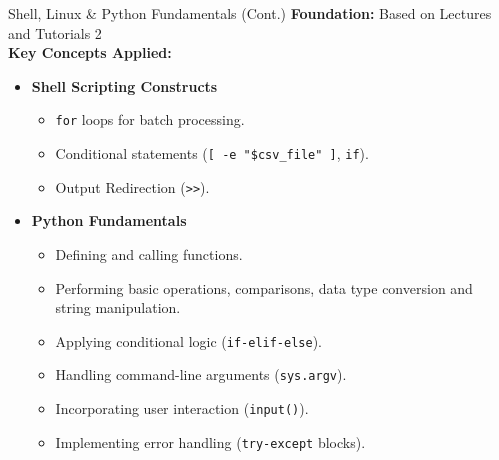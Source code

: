 \documentclass[12pt, aspectratio=169]{beamer}
\renewcommand{\small}{\fontsize{11}{13}\selectfont}
\newcommand{\rcode}[1]{{\small\texttt{#1}}}
\begin{document}
  \begin{frame}[t]{Shell, Linux \& Python Fundamentals (Cont.)}
    \textbf{Foundation:} Based on Lectures and Tutorials 2
    \\\vspace{2.5mm}
    \textbf{Key Concepts Applied:} \\\vspace{2.5mm}
    \begin{itemize}
      \item \textbf{Shell Scripting Constructs} \vspace{1mm}
      \begin{itemize}
        \item \rcode{for} loops for batch processing.
        \item Conditional statements (\rcode{[ -e "\$csv\_file" ]}, \rcode{if}).
        \item Output Redirection (\rcode{>>}).
      \end{itemize} \vspace{1mm}
      \item \textbf{Python Fundamentals} \vspace{1mm}
      \begin{itemize}
        \item Defining and calling functions.
        \item Performing basic operations, comparisons, data type conversion and string manipulation.
        \item Applying conditional logic (\rcode{if-elif-else}).
        \item Handling command-line arguments (\rcode{sys.argv}).
        \item Incorporating user interaction (\rcode{input()}).
        \item Implementing error handling (\rcode{try-except} blocks).
      \end{itemize}
    \end{itemize}
  \end{frame}
\end{document}
